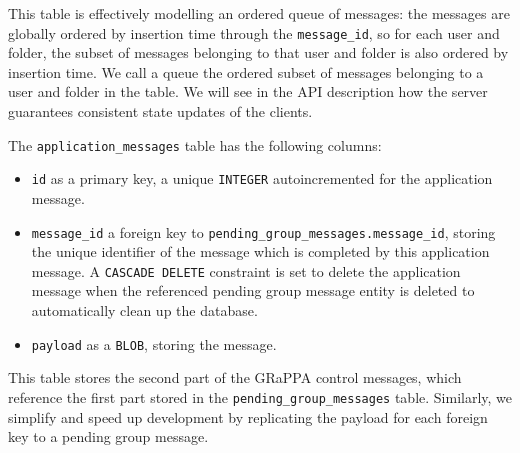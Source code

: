 This table is effectively modelling an ordered queue of messages:
the messages are globally ordered by insertion time through the \texttt{message\_id},
so for each user and folder, the subset of messages belonging to that
user and folder is also ordered by insertion time.
We call a queue the ordered subset of messages belonging to a user and folder in the table.
We will see in the API description how the server guarantees consistent state updates
of the clients.

The \texttt{application\_messages} table has the following columns:
\begin{itemize}
    \item \texttt{id} as a primary key, a unique \texttt{INTEGER} autoincremented for the application message.
    \item \texttt{message\_id} a foreign key to \texttt{pending\_group\_messages.message\_id}, storing the unique identifier of the message which is completed by this application message. A \texttt{CASCADE DELETE} constraint is set to delete the application message when the referenced pending group message entity is deleted to automatically clean up the database.
    \item \texttt{payload} as a \texttt{BLOB}, storing the message.
\end{itemize}

This table stores the second part of the GRaPPA control messages, which reference 
the first part stored in the \texttt{pending\_group\_messages} table.
Similarly, we simplify and speed up development by replicating the
payload for each foreign key to a pending group message.

